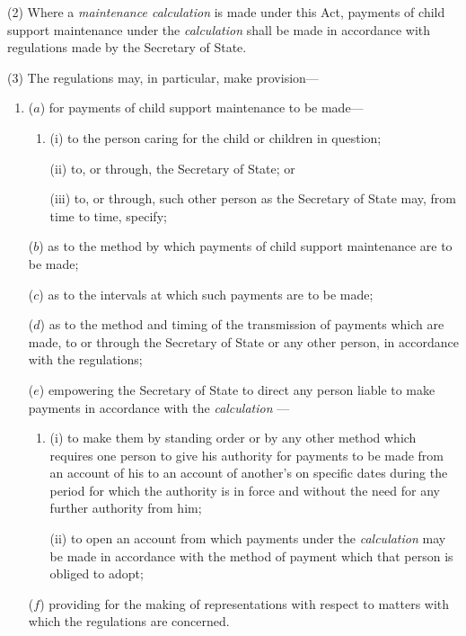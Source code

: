 \documentclass[12pt,a4paper]{article}
\begin{document}
(2) Where a 
\emph{maintenance calculation}  %
is made under this Act, payments of child support maintenance under the 
\emph{calculation}  %
shall be made in accordance with regulations made by the Secretary of State.

(3) The regulations may, in particular, make provision—
\begin{enumerate}\item[]
($a$) for payments of child support maintenance to be made—
\begin{enumerate}\item[]
(i) to the person caring for the child or children in question;

(ii) to, or through, the Secretary of State; or

(iii) to, or through, such other person as the Secretary of State may, from time to time, specify;
\end{enumerate}

($b$) as to the method by which payments of child support maintenance are to be made;

($c$) as to the intervals at which such payments are to be made;

($d$) as to the method and timing of the transmission of payments which are made, to or through the Secretary of State or any other person, in accordance with the regulations;

($e$) empowering the Secretary of State to direct any person liable to make payments in accordance with the 
\emph{calculation}%
—
\begin{enumerate}\item[]
(i) to make them by standing order or by any other method which requires one person to give his authority for payments to be made from an account of his to an account of another’s on specific dates during the period for which the authority is in force and without the need for any further authority from him;

(ii) to open an account from which payments under the 
\emph{calculation}  %
may be made in accordance with the method of payment which that person is obliged to adopt;
\end{enumerate}

($f$) providing for the making of representations with respect to matters with which the regulations are concerned.
\end{enumerate}
\end{document}
